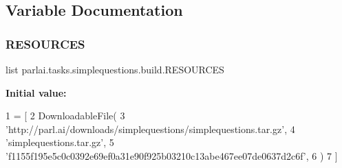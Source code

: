 \subsection{Variable Documentation}
\mbox{\label{namespaceparlai_1_1tasks_1_1simplequestions_1_1build_a42ab1f17c7dad67ca32e0da2aa5c6128}} 
\subsubsection{\texorpdfstring{R\+E\+S\+O\+U\+R\+C\+ES}{RESOURCES}}
{\footnotesize\ttfamily list parlai.\+tasks.\+simplequestions.\+build.\+R\+E\+S\+O\+U\+R\+C\+ES}

{\bfseries Initial value\+:}
\begin{DoxyCode}
1 =  [
2     DownloadableFile(
3         \textcolor{stringliteral}{'http://parl.ai/downloads/simplequestions/simplequestions.tar.gz'},
4         \textcolor{stringliteral}{'simplequestions.tar.gz'},
5         \textcolor{stringliteral}{'f1155f195e5c0c0392e69ef0a31e90f925b03210c13abe467ee07de0637d2c6f'},
6     )
7 ]
\end{DoxyCode}
